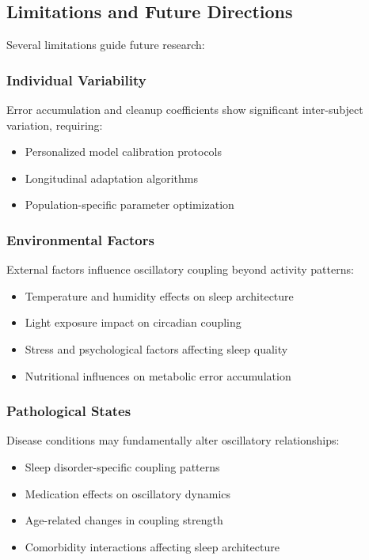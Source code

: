 \documentclass[twocolumn]{article}
\begin{document}
\subsection{Limitations and Future Directions}

Several limitations guide future research:

\subsubsection{Individual Variability}

Error accumulation and cleanup coefficients show significant inter-subject variation, requiring:
\begin{itemize}
\item Personalized model calibration protocols
\item Longitudinal adaptation algorithms
\item Population-specific parameter optimization
\end{itemize}

\subsubsection{Environmental Factors}

External factors influence oscillatory coupling beyond activity patterns:
\begin{itemize}
\item Temperature and humidity effects on sleep architecture
\item Light exposure impact on circadian coupling
\item Stress and psychological factors affecting sleep quality
\item Nutritional influences on metabolic error accumulation
\end{itemize}

\subsubsection{Pathological States}

Disease conditions may fundamentally alter oscillatory relationships:
\begin{itemize}
\item Sleep disorder-specific coupling patterns
\item Medication effects on oscillatory dynamics
\item Age-related changes in coupling strength
\item Comorbidity interactions affecting sleep architecture
\end{itemize}
\end{document}
